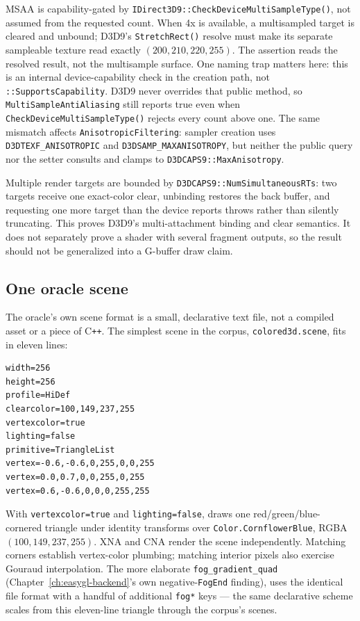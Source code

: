 MSAA is capability-gated by \texttt{IDirect3D9::CheckDeviceMultiSampleType()}, not assumed from
the requested count. When 4x is available, a multisampled target is cleared and unbound; D3D9's
\texttt{StretchRect()} resolve must make its separate sampleable texture read exactly
\((200,210,220,255)\). The assertion reads the resolved result, not the multisample surface.
One naming trap matters here: this is an internal device-capability check in the creation path,
not \texttt{::SupportsCapability}. D3D9 never overrides that public
method, so \texttt{MultiSampleAntiAliasing} still reports true even when
\texttt{CheckDeviceMultiSampleType()} rejects every count above one. The same mismatch affects
\texttt{AnisotropicFiltering}: sampler creation uses \texttt{D3DTEXF\_ANISOTROPIC} and
\texttt{D3DSAMP\_MAXANISOTROPY}, but neither the public query nor the setter consults and clamps
to \texttt{D3DCAPS9::MaxAnisotropy}.

Multiple render targets are bounded by \texttt{D3DCAPS9::NumSimultaneousRTs}: two
targets receive one exact-color clear, unbinding restores the back buffer, and requesting one
more target than the device reports throws rather than silently truncating. This proves D3D9's
multi-attachment binding and clear semantics. It does not separately prove a shader with several
fragment outputs, so the result should not be generalized into a G-buffer draw claim.

\subsection{One oracle scene}

The oracle's own scene format is a small, declarative text file, not a compiled asset or a
piece of C\texttt{++}. The simplest scene in the corpus, \texttt{colored3d.scene}, fits in
eleven lines:

\begin{lstlisting}
width=256
height=256
profile=HiDef
clearcolor=100,149,237,255
vertexcolor=true
lighting=false
primitive=TriangleList
vertex=-0.6,-0.6,0,255,0,0,255
vertex=0.0,0.7,0,0,255,0,255
vertex=0.6,-0.6,0,0,0,255,255
\end{lstlisting}

With \texttt{vertexcolor=true} and \texttt{lighting=false},  draws one
red/green/blue-cornered triangle under identity transforms over
\texttt{Color.CornflowerBlue}, RGBA $(100,149,237,255)$. XNA and CNA render the scene
independently. Matching corners establish vertex-color plumbing; matching interior pixels also
exercise Gouraud interpolation. The more elaborate \texttt{fog\_gradient\_quad}
(Chapter~\ref{ch:easygl-backend}'s own negative-\texttt{FogEnd} finding), uses the identical
file format with a handful of additional \texttt{fog*} keys --- the same declarative scheme
scales from this eleven-line triangle through the corpus's \XnaOracleSceneCount{} scenes.

